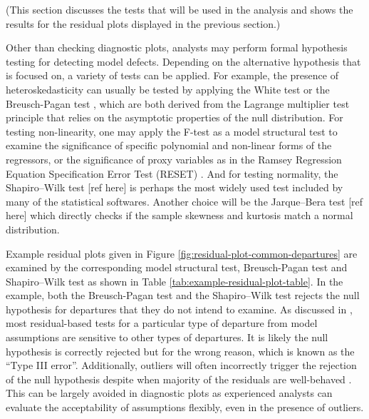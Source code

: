 \documentclass[]{interact}
\theoremstyle{plain}%
\theoremstyle{definition}
\theoremstyle{remark}
\begin{document}
(This section discusses the tests that will be used in the analysis and
shows the results for the residual plots displayed in the previous
section.)

Other than checking diagnostic plots, analysts may perform formal
hypothesis testing for detecting model defects. Depending on the
alternative hypothesis that is focused on, a variety of tests can be
applied. For example, the presence of heteroskedasticity can usually be
tested by applying the White test
\citep{white_heteroskedasticity-consistent_1980} or the Breusch-Pagan
test \citep{breusch_simple_1979}, which are both derived from the
Lagrange multiplier test \citep{silvey1959lagrangian} principle that
relies on the asymptotic properties of the null distribution. For
testing non-linearity, one may apply the F-test as a model structural
test to examine the significance of specific polynomial and non-linear
forms of the regressors, or the significance of proxy variables as in
the Ramsey Regression Equation Specification Error Test (RESET)
\citep{ramsey_tests_1969}. And for testing normality, the Shapiro--Wilk
test {[}ref here{]} is perhaps the most widely used test included by
many of the statistical softwares. Another choice will be the
Jarque--Bera test {[}ref here{]} which directly checks if the sample
skewness and kurtosis match a normal distribution.

Example residual plots given in Figure
\ref{fig:residual-plot-common-departures} are examined by the
corresponding model structural test, Breusch-Pagan test and
Shapiro--Wilk test as shown in Table
\ref{tab:example-residual-plot-table}. In the example, both the
Breusch-Pagan test and the Shapiro--Wilk test rejects the null
hypothesis for departures that they do not intend to examine. As
discussed in \citet{cook1982residuals}, most residual-based tests for a
particular type of departure from model assumptions are sensitive to
other types of departures. It is likely the null hypothesis is correctly
rejected but for the wrong reason, which is known as the ``Type III
error''. Additionally, outliers will often incorrectly trigger the
rejection of the null hypothesis despite when majority of the residuals
are well-behaved \citep{cook_applied_1999}. This can be largely avoided
in diagnostic plots as experienced analysts can evaluate the
acceptability of assumptions flexibly, even in the presence of outliers.
\end{document}
